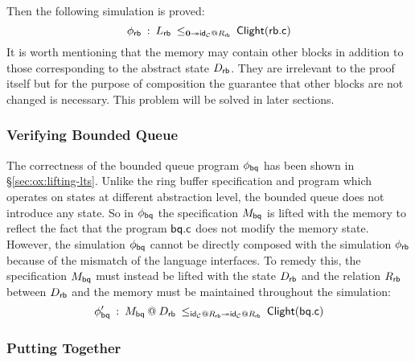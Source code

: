 Then the following simulation is proved:
\[
  \phi_\kw{rb} \::\: L_\kw{rb}
  \:\le_{\mathbf{0} \twoheadrightarrow \kw{id}_\mathcal{C} \mathbin@ R_\kw{rb}}\:
  \kw{Clight}(\kw{rb.c})
\]
It is worth mentioning that the memory may contain other blocks in addition to
those corresponding to the abstract state $D_{ \mathsf{rb} }$. They are irrelevant to
the proof itself but for the purpose of composition the guarantee that other
blocks are not changed is necessary. This problem will be solved in later
sections.

\subsubsection{Verifying Bounded Queue}

The correctness of the bounded queue program $\phi_{ \mathsf{bq} }$
has been shown in \S\ref{sec:ox:lifting-lts}.
Unlike the ring buffer specification
and program which operates on states at
different abstraction level,
the bounded queue does not introduce any state.
So in $\phi_{ \mathsf{bq} }$ the specification $M_{ \mathsf{bq} }$
is lifted with the memory to
reflect the fact that the program $ \mathsf{bq.c} $
does not modify the memory state.
However, the simulation $\phi_{ \mathsf{bq} }$
cannot be directly composed with the
simulation $\phi_{ \mathsf{rb} }$
because of the mismatch of the language interfaces.
To remedy this,
the specification $M_{ \mathsf{bq} }$ must instead be lifted
with the state $D_{ \mathsf{rb} }$
and the relation $R_{ \mathsf{rb} }$ between $D_{ \mathsf{rb} }$
and the memory must be maintained throughout the simulation:
\[
  \phi'_\kw{bq} \::\: M_\kw{bq} \mathbin@ D_\kw{rb}
  \:\le_{\kw{id}_\C\mathbin@ R_\kw{rb}
    \twoheadrightarrow
  \kw{id}_\C \mathbin@ R_\kw{rb}}\:
  \kw{Clight}(\kw{bq.c})
\]

\subsubsection{Putting Together}
\label{sec:ox:putting-together}

